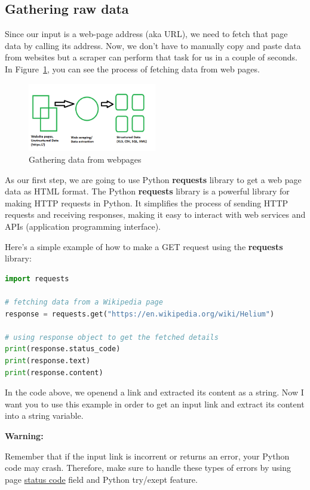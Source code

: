 \documentclass{article}
\newenvironment{warning}{
    \par\medskip
    \noindent
    \begin{minipage}{\linewidth}
    \color{red}
    \textbf{Warning:}
}{
    \end{minipage}\par\medskip
}
\begin{document}
\subsection{Gathering raw data}
Since our input is a web-page address (aka URL), we need to fetch that page data by calling its address.
Now, we don't have to manually copy and paste data from websites but a scraper can perform that task for us in a couple of seconds.
In Figure~\ref{fig:webpages}, you can see the process of fetching data from web pages.

\begin{figure}[h]
    \centering
    \includegraphics[width=0.5\textwidth]{./pics/web.png}
    \caption{Gathering data from webpages}
    \label{fig:webpages}
\end{figure}

As our first step, we are going to use Python \textbf{requests} library to get a web page data as HTML format.
The Python \textbf{requests}  library is a powerful library for making HTTP requests in Python.
It simplifies the process of sending HTTP requests and receiving responses, making it easy to interact with web services and APIs (application programming interface).

Here's a simple example of how to make a GET request using the \textbf{requests} library:

\begin{lstlisting}[language=Python, caption=Example of getting a page content]
import requests

# fetching data from a Wikipedia page
response = requests.get("https://en.wikipedia.org/wiki/Helium")

# using response object to get the fetched details
print(response.status_code)
print(response.text)
print(response.content)
\end{lstlisting}

In the code above, we openend a link and extracted its content as a string.
Now I want you to use this example in order to get an input link and extract its content into a string variable.

\begin{warning}
Remember that if the input link is incorrent or returns an error, your Python code may crash.
Therefore, make sure to handle these types of errors by using page \underline{status code} field and Python try/exept feature.
\end{warning}
\end{document}
